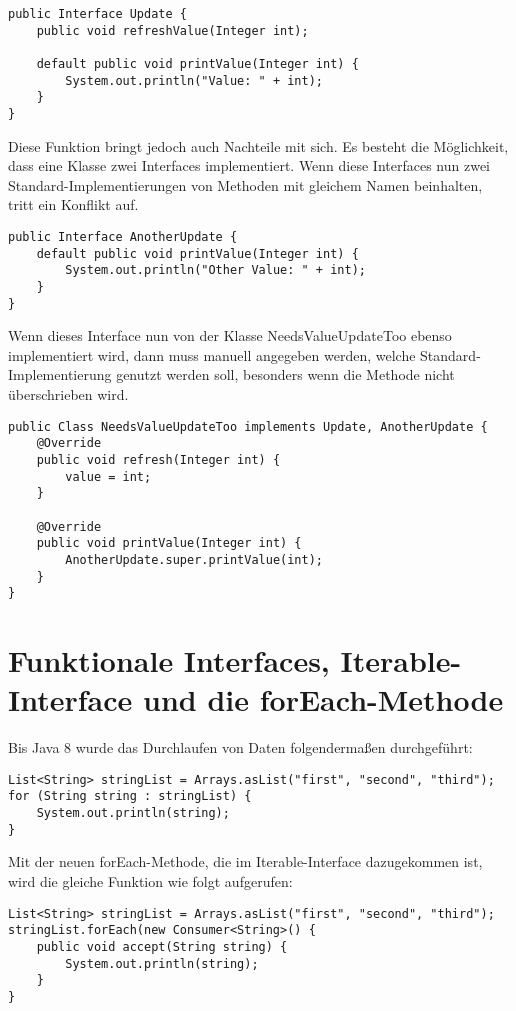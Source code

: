 \begin{lstlisting}
public Interface Update {
	public void refreshValue(Integer int);
	
	default public void printValue(Integer int) {
		System.out.println("Value: " + int);
	}
}
\end{lstlisting}

Diese Funktion bringt jedoch auch Nachteile mit sich. Es besteht die
Möglichkeit, dass eine Klasse zwei Interfaces implementiert. Wenn diese
Interfaces nun zwei Standard-Implementierungen von Methoden mit gleichem Namen
beinhalten, tritt ein Konflikt auf.
\newline

\begin{lstlisting}
public Interface AnotherUpdate {
	default public void printValue(Integer int) {
		System.out.println("Other Value: " + int);
	}
}
\end{lstlisting}

Wenn dieses Interface nun von der Klasse NeedsValueUpdateToo ebenso
implementiert wird, dann muss manuell angegeben werden, welche
Standard-Implementierung genutzt werden soll, besonders wenn die Methode nicht
überschrieben wird.

\begin{lstlisting}
public Class NeedsValueUpdateToo implements Update, AnotherUpdate {
	@Override
	public void refresh(Integer int) {
		value = int;
	}
	
	@Override
	public void printValue(Integer int) {
		AnotherUpdate.super.printValue(int);
	}
}
\end{lstlisting}

\section{Funktionale Interfaces, Iterable-Interface und die forEach-Methode}
\label{sec:IIufEM}

Bis Java 8 wurde das Durchlaufen von Daten folgendermaßen durchgeführt:

\begin{lstlisting}
List<String> stringList = Arrays.asList("first", "second", "third");
for (String string : stringList) {
	System.out.println(string);
}
\end{lstlisting}

Mit der neuen forEach-Methode, die im Iterable-Interface dazugekommen ist, wird
die gleiche Funktion wie folgt aufgerufen:

\begin{lstlisting}
List<String> stringList = Arrays.asList("first", "second", "third");
stringList.forEach(new Consumer<String>() {
	public void accept(String string) {
		System.out.println(string);
	}
}
\end{lstlisting}

